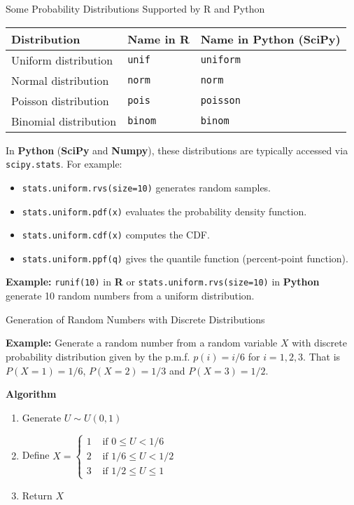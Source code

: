 \documentclass[8pt]{beamer}
\begin{document}
\begin{frame}{Some Probability Distributions Supported by R and Python}
\begin{tabular}{lll}
Distribution & Name in R & Name in Python (SciPy)\\
\hline
Uniform distribution & \texttt{unif} & \texttt{uniform}\\
Normal distribution & \texttt{norm} & \texttt{norm}\\
Poisson distribution & \texttt{pois} & \texttt{poisson}\\
Binomial distribution & \texttt{binom} & \texttt{binom}\\
\end{tabular}
\vspace{3mm}

In {\bf Python} (\textbf{SciPy} and \textbf{Numpy}), these distributions are typically accessed via \texttt{scipy.stats}. For example:
\begin{itemize}
  \item \texttt{stats.uniform.rvs(size=10)} generates random samples.
  \item \texttt{stats.uniform.pdf(x)} evaluates the probability density function.
  \item \texttt{stats.uniform.cdf(x)} computes the CDF.
  \item \texttt{stats.uniform.ppf(q)} gives the quantile function (percent-point function).
\end{itemize}

{\bf Example:}  
\texttt{runif(10)} in {\bf R} or \texttt{stats.uniform.rvs(size=10)} in {\bf Python} generate 10 random numbers from a uniform distribution.
\end{frame}

\begin{frame}{Generation of Random Numbers with Discrete Distributions}
\vspace{2mm}

{\bf Example:} Generate a random number from a random variable $X$ with discrete probability distribution given by the p.m.f.  $p(i)=i/6$ for $i=1,2,3$. That is $P(X=1)=1/6$,
$P(X=2)=1/3$ and $P(X=3)=1/2$.
\vspace{2mm}

{\bf Algorithm}
\vspace{2mm}

\begin{enumerate}
\item Generate $U\sim U(0,1)$
\item Define $X=\left\{   
\begin{array}{ll} 
1 &  \text { if } 0 \leq U<1/6\\
2 &  \text { if }   1/6 \leq U<1/2\\ 
3 &  \text { if }   1/2 \leq U \leq 1  
\end{array}  
\right. $
\item Return $X$
\end{enumerate}
\end{frame}
\end{document}
